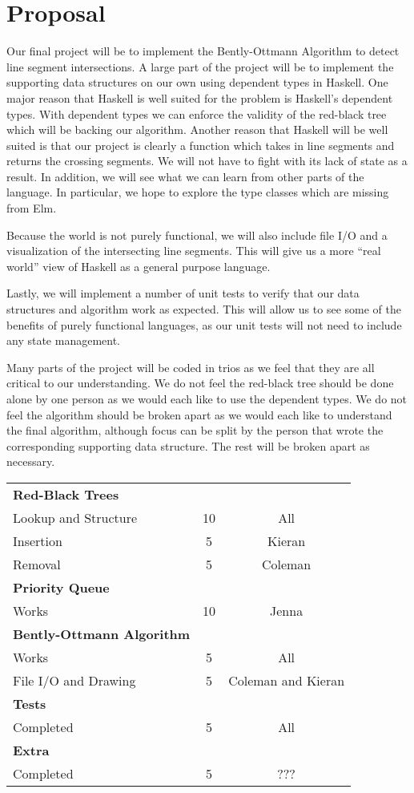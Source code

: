 \documentclass{general}
\begin{document}
\createtitlepage{}

\section*{Proposal}

Our final project will be to implement the Bently-Ottmann Algorithm to detect
line segment intersections. A large part of the project will be to implement the
supporting data structures on our own using dependent types in Haskell. One
major reason that Haskell is well suited for the problem is Haskell's dependent
types. With dependent types we can enforce the validity of the red-black tree
which will be backing our algorithm. Another reason that Haskell will be well
suited is that our project is clearly a function which takes in line segments
and returns the crossing segments. We will not have to fight with its lack of
state as a result. In addition, we will see what we can learn from other parts
of the language. In particular, we hope to explore the type classes which are
missing from Elm.

Because the world is not purely functional, we will also include file I/O and a
visualization of the intersecting line segments. This will give us a more ``real
world'' view of Haskell as a general purpose language.

Lastly, we will implement a number of unit tests to verify that our data
structures and algorithm work as expected. This will allow us to see some of the
benefits of purely functional languages, as our unit tests will not need to
include any state management.

Many parts of the project will be coded in trios as we feel that they are all
critical to our understanding. We do not feel the red-black tree should be done
alone by one person as we would each like to use the dependent types. We do not
feel the algorithm should be broken apart as we would each like to understand
the final algorithm, although focus can be split by the person that wrote the
corresponding supporting data structure. The rest will be broken apart as
necessary.

\begin{table}[h]
  \centering
  \begin{tabular}{lcc}
    \textbf{Red-Black Trees} & & \\
    Lookup and Structure & 10 & All \\
    Insertion & 5 & Kieran \\
    Removal & 5 & Coleman \\
    \textbf{Priority Queue} & & \\
    Works & 10 & Jenna \\
    \textbf{Bently-Ottmann Algorithm} & & \\
    Works & 5 & All \\
    File I/O and Drawing & 5 & Coleman and Kieran \\
    \textbf{Tests} & & \\
    Completed & 5 & All \\
    \textbf{Extra} & &  \\
    Completed & 5 & ??? \\
  \end{tabular}
\end{table}
\end{document}
